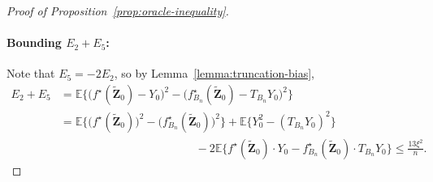 \documentclass[12pt]{article}
\def\tilde{\widetilde}
\begin{document}
\begin{proof}[Proof of Proposition~\ref{prop:oracle-inequality}]
    \paragraph{Bounding $E_2 + E_5$:} Note that $E_5 = -2E_2$, so by Lemma~\ref{lemma:truncation-bias},
    \begin{align}
        E_2 + E_5 &= \mathbb{E}\bigl\{ \bigl(f^{\star}(\tilde{\bm Z}_0) - Y_0\bigr)^2 - \bigl(f^{\star}_{B_n}(\tilde{\bm Z}_0) - T_{B_n}Y_0\bigr)^2 \bigr\}\nonumber\\
        &= \mathbb{E}\bigl\{ \bigl(f^{\star}(\tilde{\bm Z}_0)\bigr)^2 - \bigl( f^{\star}_{B_n}(\tilde{\bm Z}_0) \bigr)^2 \bigr\} + \mathbb{E}\bigl\{ Y_0^2 - (T_{B_n} Y_0)^2 \bigr\}\nonumber\\
        &\hspace{5cm} - 2\mathbb{E}\bigl\{f^{\star}(\tilde{\bm Z}_0)\cdot Y_0 - f^{\star}_{B_n}(\tilde{\bm Z}_0) \cdot T_{B_n}Y_0\bigr\} \leq \frac{13\xi^2}{n}. \label{eq:oracle-inequality-E2+E5}
    \end{align}


\end{proof}
\end{document}
